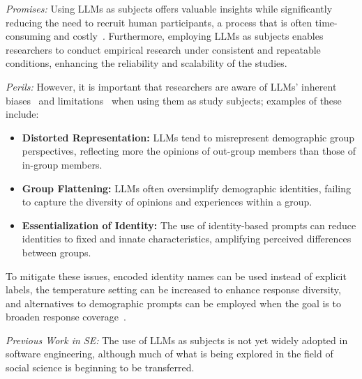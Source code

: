 \documentclass[11pt]{article}
\begin{document}
\emph{Promises:} Using LLMs as subjects offers valuable insights while significantly reducing the need to recruit human participants, a process that is often time-consuming and costly~\cite{DBLP:conf/vl/Madampe0HO24}. 
Furthermore, employing LLMs as subjects enables researchers to conduct empirical research under consistent and repeatable conditions, enhancing the reliability and scalability of the studies.

\emph{Perils:} However, it is important that researchers are aware of LLMs' inherent biases~\cite{Crowell2023} and limitations~\cite{DBLP:journals/ais/HardingDLL24, DBLP:journals/corr/abs-2402-01908} when using them as study subjects; examples of these include:
\begin{itemize}
    \item \textbf{Distorted Representation:} LLMs tend to misrepresent demographic group perspectives, reflecting more the opinions of out-group members than those of in-group members.
    \item \textbf{Group Flattening:} LLMs often oversimplify demographic identities, failing to capture the diversity of opinions and experiences within a group.
    \item \textbf{Essentialization of Identity:} The use of identity-based prompts can reduce identities to fixed and innate characteristics, amplifying perceived differences between groups.
\end{itemize}
To mitigate these issues, encoded identity names can be used instead of explicit labels, the temperature setting can be increased to enhance response diversity, and alternatives to demographic prompts can be employed when the goal is to broaden response coverage~\cite{DBLP:journals/ais/HardingDLL24, DBLP:journals/corr/abs-2402-01908}.

\emph{Previous Work in SE:} The use of LLMs as subjects is not yet widely adopted in software engineering, although much of what is being explored in the field of social science is beginning to be transferred.
\end{document}
